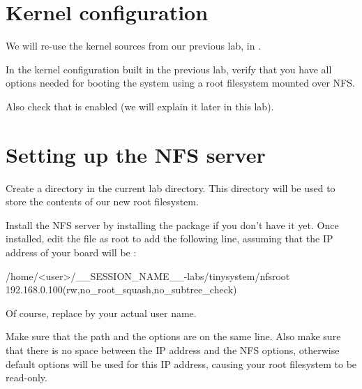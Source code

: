 \section{Kernel configuration}

We will re-use the kernel sources from our previous lab, in
.

In the kernel configuration built in the previous lab, verify that you
have all options needed for booting the system using a root filesystem
mounted over NFS.


Also check that  is
enabled (we will explain it later in this lab).

\section{Setting up the NFS server}

Create a  directory in the current lab directory. This
 directory will be used to store the contents of our new
root filesystem.

Install the NFS server by installing the 
package if you don't have it yet. Once installed, edit the
 file as root to add the following line, assuming that the
IP address of your board will be :

\begin{fileinput}
/home/<user>/__SESSION_NAME__-labs/tinysystem/nfsroot 192.168.0.100(rw,no_root_squash,no_subtree_check)
\end{fileinput}

Of course, replace  by your actual user name.

Make sure that the path and the options are on the same line.
Also make sure that there is no space between the IP address and the NFS
options, otherwise default options will be used for this IP address,
causing your root filesystem to be read-only.

